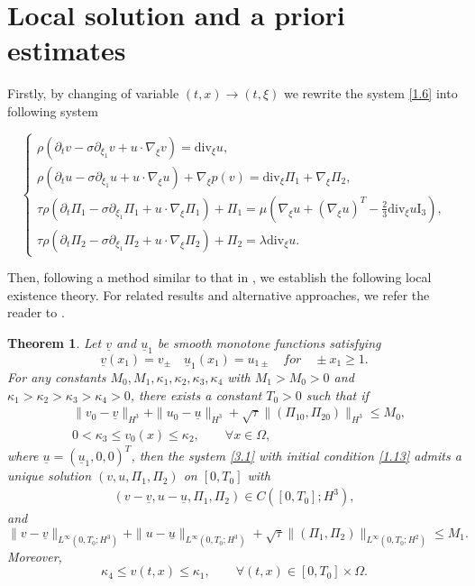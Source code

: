 \documentclass[10pt,reqno]{amsart}
\numberwithin{equation}{section}
\newtheorem{theorem}{Theorem}[section]
\newcommand{\ddiv}{\mathrm{div}}
\begin{document}
\section{Local solution and a priori estimates}

Firstly, by changing of variable $(t, x)\rightarrow(t,\xi)$ we rewrite the system \eqref{1.6} into following system

\begin{equation}\label{3.1}
\begin{cases}
\rho\left(\partial_tv-\sigma\partial_{\xi_1}v+u\cdot\nabla_{\xi} v\right)=\ddiv_{\xi} u,\\
\rho\left(\partial_tu-\sigma\partial_{\xi_1}u+u\cdot\nabla_{\xi} u\right)+\nabla_{\xi}p(v)=\ddiv_{\xi}\Pi_1+\nabla_{\xi}\Pi_2,\\
\tau\rho\left(\partial_t\Pi_1-\sigma\partial_{\xi_1}\Pi_1+u\cdot\nabla_{\xi} \Pi_1\right)+\Pi_1
   =\mu\left(\nabla_{\xi} u+(\nabla_{\xi} u)^T-\frac{2}{3}\ddiv_{\xi} u \mathrm I_3\right),\\
\tau\rho\left(\partial_t\Pi_2-\sigma\partial_{\xi_1}\Pi_2+u\cdot\nabla_{\xi}\Pi_2\right)+\Pi_2
=\lambda\ddiv_{\xi} u.
\end{cases}
\end{equation}

Then,  following a method similar to that in \cite{hufes2017}, we establish the following local existence theory. For related results and alternative approaches, we refer the reader to \cite{JR, WY, MV20, TA}.

\begin{theorem}\label{th3.1}
Let $\underline{v}$ and $\underline{u}_1$ be smooth monotone functions satisfying
\[
\underline{v}(x_1)=v_{\pm} \quad \underline{u}_1(x_1)=u_{1\pm} \quad for \quad \pm x_1\geq1.
\]
For any constants $M_0,M_1,\kappa_1,\kappa_2,\kappa_3,\kappa_4$ with $M_1>M_0>0$ and $\kappa_1>\kappa_2>\kappa_3>\kappa_4>0$, there exists a constant $T_0>0$ such that if
\[
\begin{aligned}
&\|v_0-\underline{v}\|_{H^3}+\|u_0-\underline{u}\|_{H^3}
+\sqrt{\tau}\|(\Pi_{10}, \Pi_{20})\|_{H^3}\leq M_0,\\
&0<\kappa_3\leq v_0(x)\leq\kappa_2,\qquad \forall x\in\Omega,
\end{aligned}
\]
where $\underline{u}=(\underline{u}_1, 0, 0)^T$, then the system \eqref{3.1} with initial condition \eqref{1.13} admits a unique solution $(v, u, \Pi_1, \Pi_2)$ on $[0,T_0]$ with
\[
\begin{aligned}
(v-\underline{v}, u-\underline{u}, \Pi_1, \Pi_2)\in C([0,T_0];H^3),
\end{aligned}
\]
and
\[
\|v-\underline{v}\|_{L^{\infty}(0,T_0;H^3)}+\|u-\underline{u}\|_{L^{\infty}(0,T_0;H^3)}
+\sqrt{\tau}\|(\Pi_1, \Pi_2)\|_{L^{\infty}(0,T_0;H^2)}\leq M_1.
\]
Moreover,
\[
\kappa_4\leq v(t,x)\leq\kappa_1,\qquad \forall(t,x)\in[0,T_0]\times\Omega.
\]
\end{theorem}
\end{document}
